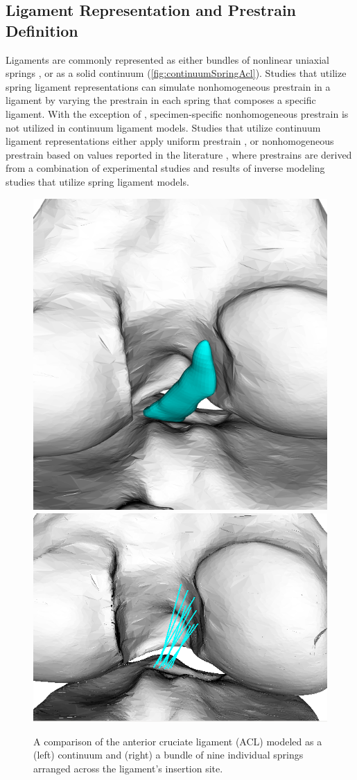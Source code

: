\subsection*{Ligament Representation and Prestrain Definition}
Ligaments are commonly represented as either bundles of nonlinear uniaxial springs \citep{blankevoort_ligament-bone_1991,baldwin_efficient_2009,amiri_computational_2012,kia_multibody_2016}, or as a solid continuum \citep{gardiner_subject-specific_2003,pena_three-dimensional_2006,dhaher_effect_2010} (\autoref{fig:continuumSpringAcl}). Studies that utilize spring ligament representations can simulate nonhomogeneous prestrain in a ligament by varying the prestrain in each spring that composes a specific ligament. With the exception of \cite{gardiner_subject-specific_2003}, specimen-specific nonhomogeneous prestrain is not utilized in continuum ligament models. Studies that utilize continuum ligament representations either apply uniform prestrain \citep{limbert_three-dimensional_2004,song_three-dimensional_2004,beidokhti_influence_2017}, or nonhomogeneous prestrain based on values reported in the literature \citep{pena_three-dimensional_2006,dhaher_effect_2010}, where prestrains are derived from a combination of experimental studies and results of inverse modeling studies that utilize spring ligament models.

\begin{figure}
    \centering
    \includegraphics[width=0.35\linewidth]{../img/Knee_ACL_Close.png}
    \includegraphics[width=0.45\linewidth]{../img/Knee_ACL_Springs_Close.png}
    \caption{A comparison of the anterior cruciate ligament (ACL) modeled as a (left) continuum and (right) a bundle of nine individual springs arranged across the ligament's insertion site.}
    \label{fig:continuumSpringAcl}
\end{figure}

